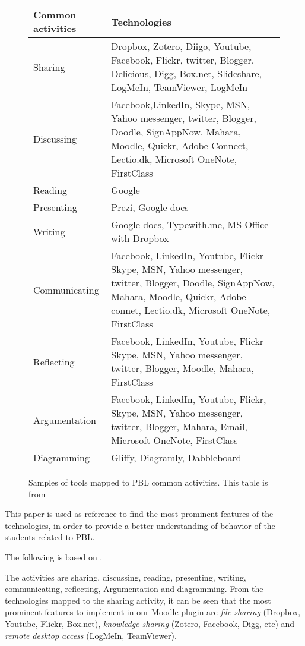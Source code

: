 \begin{figure}		
\begin{tabular}{|p{3cm}|p{}|}
\hline
Common activities & Technologies \\ \hline
Sharing & Dropbox, Zotero, Diigo, Youtube, Facebook, Flickr, twitter, Blogger, Delicious, Digg, Box.net, Slideshare, LogMeIn, 
TeamViewer, LogMeIn  \\ \hline
Discussing & Facebook,LinkedIn, Skype, MSN, Yahoo messenger, twitter, Blogger, Doodle, SignAppNow, Mahara, Moodle, Quickr, Adobe Connect, Lectio.dk, Microsoft OneNote, FirstClass \\ \hline
Reading & Google \\ \hline
Presenting & Prezi, Google docs \\ \hline
Writing & Google docs, Typewith.me, MS Office with Dropbox \\ \hline
Communicating & Facebook, LinkedIn, Youtube, Flickr Skype, MSN, Yahoo messenger, twitter, Blogger, Doodle, SignAppNow, Mahara, Moodle, Quickr, Adobe connet, Lectio.dk, Microsoft OneNote, FirstClass \\ \hline
Reflecting & Facebook, LinkedIn, Youtube, Flickr Skype, MSN, Yahoo messenger, twitter, Blogger, Moodle, Mahara, FirstClass \\ \hline
Argumentation & Facebook, LinkedIn, Youtube, Flickr, Skype, MSN, Yahoo messenger, twitter, Blogger, Mahara, Email, Microsoft OneNote, FirstClass \\ \hline
Diagramming & Gliffy, Diagramly, Dabbleboard \\ \hline

\end{tabular}
\caption{Samples of tools mapped to PBL common activities. This table is from~\cite{khalidRongbutsriBuus}   }
\label{tab:figure3}
\end{figure}


This paper is used as reference to find the most prominent features of the technologies, in order to provide a better understanding of behavior of the students related to PBL.

The following is based on .

The activities are sharing, discussing, reading, presenting, writing, communicating, reflecting, Argumentation and diagramming.
From the technologies mapped to the sharing activity, it can be seen that the most prominent features to implement in our Moodle plugin are \textit{file sharing} (Dropbox, Youtube, Flickr, Box.net), \textit{knowledge sharing} (Zotero, Facebook, Digg, etc) and \textit{remote desktop access} (LogMeIn, TeamViewer).

